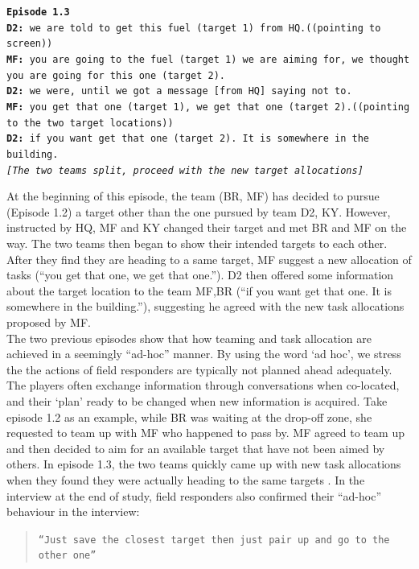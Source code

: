 \noindent\texttt{\textbf{Episode 1.3}\\
\textbf{D2:} we are told to get this fuel (target 1) from HQ.((pointing to screen))\\
\textbf{MF:} you are going to the fuel (target 1) we are aiming for, we thought you are going for this one (target 2).\\
\textbf{D2:} we were, until we got a message [from HQ] saying not to. \\
\textbf{MF:} you get that one (target 1), we get that one (target 2).((pointing to the two target locations))\\
\textbf{D2:} if you want get that one (target 2). It is somewhere in the building.\\
\emph{[The two teams split, proceed with the new target allocations]}\\}

At the beginning of this episode, the team (BR, MF) has decided to pursue (Episode 1.2) a target other than the one pursued by team D2, KY. However, instructed by HQ, MF and KY changed their target and met BR and MF on the way. The two teams then began to show their intended targets to each other. After they find they are heading to a same target, MF suggest a new allocation of tasks (``you get that one, we get that one.''). D2 then offered some information about the target location to the team MF,BR (``if you want get that one. It is somewhere in the building.''), suggesting he agreed with the new task allocations proposed by MF. \\

The two previous episodes show that how teaming and task allocation are achieved in a seemingly ``ad-hoc'' manner. By using the word `ad hoc', we stress the the actions of field responders are typically not planned ahead adequately. The players often exchange information through conversations when co-located, and their `plan' ready to be changed when new information is acquired. Take episode 1.2 as an example, while BR was waiting at the drop-off zone, she requested to team up with MF who happened to pass by. MF agreed to team up and then decided to aim for an available target that have not been aimed by others. In episode 1.3, the two teams quickly came up with new task allocations when they found they were actually heading to the same targets . In the interview at the end of study, field responders also confirmed their ``ad-hoc'' behaviour in the interview:\\

\begin{quote}
\texttt{``Just save the closest target then just pair up and go to the other one'' }
\end{quote}

